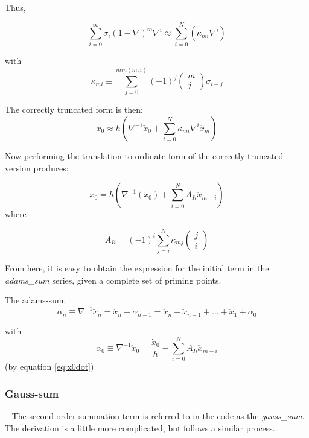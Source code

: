 Thus,

\begin{equation*}
\sum_{i=0}^{\infty}\sigma _{i}(1-\nabla )^{m}\nabla ^{i}\approx
\sum _{i=0}^{N}\left(\kappa_{mi}\nabla ^{i}\right)
\end{equation*}

with
\begin{equation*}
\kappa_{mi} \equiv
\sum_{j=0}^{min(m,i)}(-1)^{j}
\left(\begin{matrix}m\\j\end{matrix}\right)
\sigma_{i-j}
\end{equation*}


The correctly truncated form is then:
\begin{equation*}
\dot x_{0} \approx h\left( \nabla ^{-1}\ddot{x}_{0} + 
\sum_{i=0}^{N}\kappa_{mi}\nabla ^i \ddot{x}_m \right)
\end{equation*}


Now performing the translation to ordinate form of the correctly truncated version produces:


\begin{equation} \label{eq:x0dot}
\dot x_{0} = h\left(\nabla ^{-1}({\ddot{x}}_{0})+
\sum_{i=0}^{N}A_{Ii}{\ddot{x}}_{m-i}\right)
\end{equation}
where

\begin{equation} \label{eq:A_Ii}
A_{Ii}=(-1)^{i}\sum _{j=i}^{N}\kappa
_{mj}\left(\begin{matrix}j\\i\end{matrix}\right)
\end{equation}

From here, it is easy to obtain the expression for the initial term in
the \textit{adams\_sum} series, given a complete set of priming points.

The adams-sum, 
\begin{equation}
\alpha _{n} \equiv \nabla ^{-1} \ddot{x}_{n} = \ddot{x}_{n}+\alpha_{n-1}=
\ddot{x}_{n}+\ddot{x}_{n-1}+...+\ddot{x}_{1}+\alpha_{0}
\end{equation}

with
\begin{equation*}
\alpha_0 \equiv \nabla ^{-1}\ddot{x}_{0}=\frac{\dot{x}_{0}}{h}-\sum_{i=0}^{N}A_{Ii}\ddot{x}_{m-i}
\end{equation*}
(by equation \ref{eq:x0dot})

\subsubsection{Gauss-sum}\ \newline
The second-order summation term is referred to in the code as the
\textit{gauss\_sum}. The derivation is a little more complicated, but follows
a similar process.

